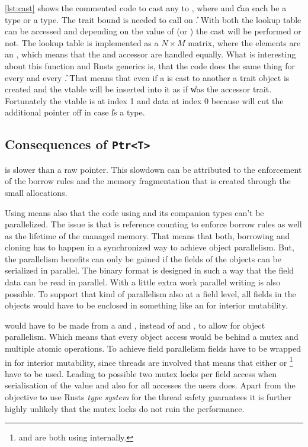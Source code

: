 \documentclass[thesis]{subfiles}
\begin{document}
    \autoref{lst:cast} shows the commented code to cast any \PtrT to , where \T and \U can each be a \struct type or a \trait type.
    The \CastAble trait bound is needed to call  on \U.
    With both \ids the lookup table can be accessed and depending on the value of \OptionT (\SomeT or \None) the cast will be performed or not.
    The lookup table is implemented as a $N \times M$ matrix, where the elements are an , which means that the \struct and accessor \trait are handled equally.
    What is interesting about this function and Rusts generics is, that the code does the same thing for every \T and every \U.
    That means that even if a \struct is cast to another \struct a trait object is created and the vtable will be inserted into it as if \U was the accessor trait.
    Fortunately the vtable is at index 1 and data at index 0 because  will cut the additional pointer off in case \U is a \struct type.

  \subsection{Consequences of \texttt{Ptr<T>}}\label{sec:badptr}
    \PtrT is slower than a raw pointer.
    This slowdown can be attributed to the enforcement of the borrow rules and the memory fragmentation that is created through the small allocations.

    Using \PtrT means also that the code using \PtrT and its companion types can't be parallelized.
    The issue is that \PtrT is reference counting to enforce borrow rules as well as the lifetime of the managed memory.
    That means that both, borrowing and cloning has to happen in a synchronized way to achieve object parallelism.
    But, the parallelism benefits can only be gained if the fields of the objects can be serialized in parallel.
    The binary format is designed in such a way that the field data can be read in parallel.
    With a little extra work parallel writing is also possible.
    To support that kind of parallelism also at a field level, all fields in the objects would have to be enclosed in something like an \UnsafeCellT for interior mutability.

    \PtrT would have to be made from a \ArcT and \RwLockT, instead of \RcT and \RefCellT, to allow for object parallelism.
    Which means that every object access would be behind a mutex and multiple atomic operations\autocite[std::sync::Arc, std::sync::RwLock]{rust-doc}.
    To achieve field parallelism fields have to be wrapped in \UnsafeCellT for interior mutability, since threads are involved that means that either \MutexT or \RwLockT\footnote{
      \MutexT and \RwLockT are both using \UnsafeCellT internally.\autocite[std::sync::Mutex, std::sync::RwLock]{rust-doc}
    } have to be used.
    Leading to possible two mutex locks per field access when serialisation of the value and also for all accesses the users does.
    Apart from the objective to use Rusts \emph{type system} for the thread safety guarantees it is further highly unlikely that the mutex locks do not ruin the performance.
\end{document}
